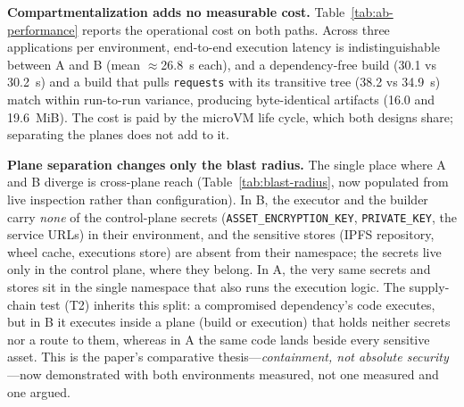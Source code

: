 \textbf{Compartmentalization adds no measurable cost.}
Table~\ref{tab:ab-performance} reports the operational cost on both paths. Across
three applications per environment, end-to-end execution latency is
indistinguishable between A and B (mean $\approx$26.8~s each), and a dependency-free
build (30.1 vs 30.2~s) and a build that pulls \texttt{requests} with its transitive
tree (38.2 vs 34.9~s) match within run-to-run variance, producing byte-identical
artifacts (16.0 and 19.6~MiB). The cost is paid by the microVM life cycle, which
both designs share; separating the planes does not add to it.

\textbf{Plane separation changes only the blast radius.} The single place where A
and B diverge is cross-plane reach (Table~\ref{tab:blast-radius}, now populated
from live inspection rather than configuration). In B, the executor and the builder
carry \emph{none} of the control-plane secrets
(\texttt{ASSET\_ENCRYPTION\_KEY}, \texttt{PRIVATE\_KEY}, the service URLs) in their
environment, and the sensitive stores (IPFS repository, wheel cache, executions
store) are absent from their namespace; the secrets live only in the control plane,
where they belong. In A, the very same secrets and stores sit in the single
namespace that also runs the execution logic. The supply-chain test (T2) inherits
this split: a compromised dependency's code executes, but in B it executes inside a
plane (build or execution) that holds neither secrets nor a route to them, whereas
in A the same code lands beside every sensitive asset. This is the paper's
comparative thesis---\emph{containment, not absolute security}---now demonstrated
with both environments measured, not one measured and one argued.

